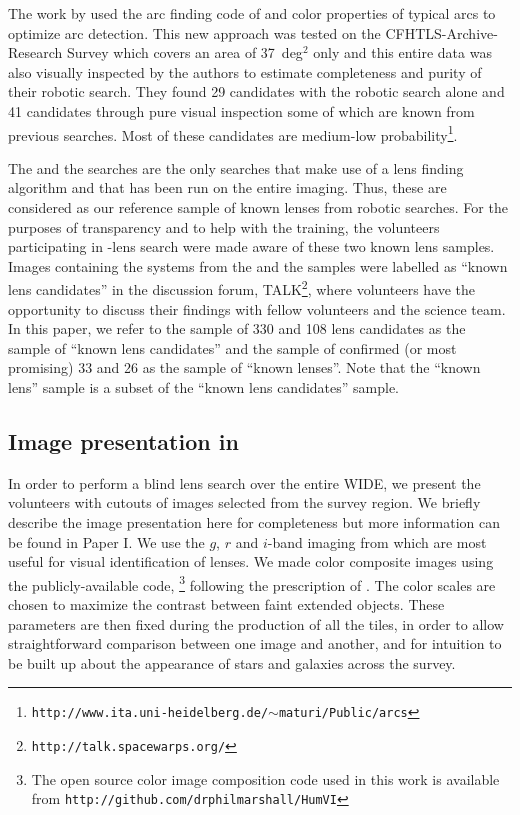\documentclass[useAMS,usenatbib,a4paper]{mn2e}
\begin{document}
The work by \citet{Maturi2014} used the arc finding code of
\citet{Seidel2007} and color properties of typical arcs to optimize arc
detection. This new approach was tested on the CFHTLS-Archive-Research
Survey \citep[CARS,][]{Erben2009} which covers an area of 37~deg$^2$
only and this entire data was also visually inspected by the authors to
estimate completeness and purity of their robotic search. They found 29
candidates with the robotic search alone and 41 candidates through pure
visual inspection some of which are known from previous searches. Most
of these candidates are medium-low
probability\footnote{\texttt{http://www.ita.uni-heidelberg.de/$\sim$maturi/Public/arcs}}.

The \rf and the \af searches are the only searches that make use of a
lens finding algorithm and that has been run on the entire \cfhtls
imaging.  Thus, these are considered as our reference sample of known
lenses from robotic searches. For the purposes of transparency and to
help with the training, the volunteers participating in \sw-\cfhtls lens
search were made aware of these two known lens samples. Images
containing the systems from the \rf and the \af samples were labelled as
``known lens candidates'' in the \sw discussion forum,
TALK\footnote{\texttt{http://talk.spacewarps.org/}}, where volunteers have the
opportunity to discuss their findings with fellow volunteers and the
science team. In this paper, we refer to the sample of 330 \rf and 108
\af lens candidates as the sample of ``known lens candidates'' and the
sample of confirmed (or most promising) 33 \rf and 26 \af as the sample
of ``known lenses''. Note that the ``known lens'' sample is a subset of
the ``known lens candidates'' sample.


\subsection{Image presentation in \sw}
\label{sec:data:impres}
In order to perform a blind lens search over the entire \cfhtls
WIDE, we present the volunteers with cutouts of images selected
from the survey region. We briefly describe the image presentation here
for completeness but more information can be found in Paper I. We use
the $g$, $r$ and $i$-band imaging from \cfhtls which are most useful for
visual identification of lenses.  We made color composite images using
the publicly-available code, \humvi\footnote{The open source  color image
composition code used in this work is available from
\texttt{http://github.com/drphilmarshall/HumVI}} following the
prescription of \citet{Lupton2004}. The color scales are chosen to
maximize the contrast between faint extended objects. These parameters
are then fixed during the production of all the tiles, in order to allow
straightforward comparison between one image and another, and for
intuition to be built up about the appearance of stars and galaxies
across the survey.
\end{document}
